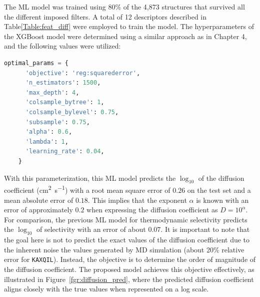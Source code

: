 \documentclass[main]{subfiles}
\begin{document}
The ML model was trained using {80\%} of the 4,873 structures that survived all the different imposed filters. A total of 12 descriptors described in Table\ref{Table:feat_diff} were employed to train the model. The hyperparameters of the XGBoost model were determined using a similar approach as in Chapter 4, and the following values were utilized:

\begin{lstlisting}[language=Python]
  optimal_params = {
      'objective': 'reg:squarederror',
      'n_estimators': 1500,
      'max_depth': 4,
      'colsample_bytree': 1,
      'colsample_bylevel': 0.75,
      'subsample': 0.75,
      'alpha': 0.6,
      'lambda': 1,
      'learning_rate': 0.04,
    }
\end{lstlisting}

With this parameterization, this ML model predicts the $\log_{10}$ of the diffusion coefficient (\si{\square\cm\per\s}) with a root mean square error of $0.26$ on the test set and a mean absolute error of $0.18$. This implies that the exponent $\alpha$ is known with an error of approximately $0.2$ when expressing the diffusion coefficient as $D = 10^{\alpha}$. For comparison, the previous ML model for thermodynamic selectivity predicts the $\log_{10}$ of selectivity with an error of about $0.07$. It is important to note that the goal here is not to predict the exact values of the diffusion coefficient due to the inherent noise the values generated by MD simulation (about {20\% relative error for \texttt{KAXQIL}}). Instead, the objective is to determine the order of magnitude of the diffusion coefficient. The proposed model achieves this objective effectively, as illustrated in Figure~\ref{fgr:diffusion_pred}, where the predicted diffusion coefficient aligns closely with the true values when represented on a log scale.
\end{document}
